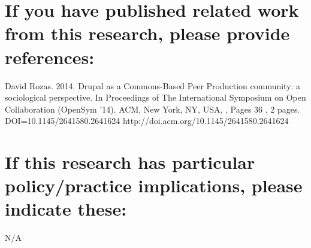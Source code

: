 \documentclass[10pt,a4paper]{article}
\begin{document}
\section{If you have published related work from this research, please provide references:}

David Rozas. 2014. Drupal as a Commons-Based Peer Production community: a sociological perspective. In Proceedings of The International Symposium on Open Collaboration (OpenSym '14). ACM, New York, NY, USA, , Pages 36 , 2 pages. DOI=10.1145/2641580.2641624 http://doi.acm.org/10.1145/2641580.2641624


\section{If this research has particular policy/practice implications, please indicate these:}

N/A
\end{document}
